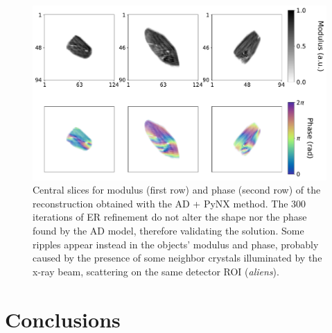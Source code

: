\begin{figure}[H]
  \centering
  \includegraphics[width=\textwidth]{figures/AD/ad_pynx_mouad.pdf}
  \caption{Central slices for modulus (first row) and phase (second row) of the reconstruction obtained with the AD + PyNX method.
  The 300 iterations of ER refinement do not alter the shape nor the phase found by the AD model, therefore validating the solution.
  Some ripples appear instead in the objects' modulus and phase, probably caused by the presence of some neighbor crystals illuminated by the 
  x-ray beam, scattering on the same detector ROI (\textit{aliens}). }
  \label{fig:adpynx_mouad}
\end{figure}


\section{Conclusions}


